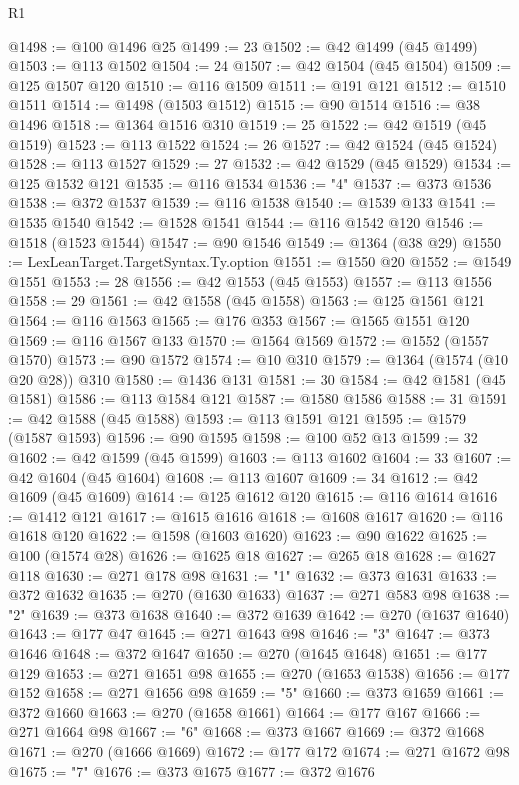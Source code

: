 \begin{lexlean}{R1}
\begin{coremodule}
@1498 := @100 @1496 @25
@1499 := 23
@1502 := @42 @1499 (@45 @1499)
@1503 := @113 @1502
@1504 := 24
@1507 := @42 @1504 (@45 @1504)
@1509 := @125 @1507 @120
@1510 := @116 @1509
@1511 := @191 @121
@1512 := @1510 @1511
@1514 := @1498 (@1503 @1512)
@1515 := @90 @1514
@1516 := @38 @1496
@1518 := @1364 @1516 @310
@1519 := 25
@1522 := @42 @1519 (@45 @1519)
@1523 := @113 @1522
@1524 := 26
@1527 := @42 @1524 (@45 @1524)
@1528 := @113 @1527
@1529 := 27
@1532 := @42 @1529 (@45 @1529)
@1534 := @125 @1532 @121
@1535 := @116 @1534
@1536 := "4"
@1537 := @373 @1536
@1538 := @372 @1537
@1539 := @116 @1538
@1540 := @1539 @133
@1541 := @1535 @1540
@1542 := @1528 @1541
@1544 := @116 @1542 @120
@1546 := @1518 (@1523 @1544)
@1547 := @90 @1546
@1549 := @1364 (@38 @29)
@1550 := LexLeanTarget.TargetSyntax.Ty.option
@1551 := @1550 @20
@1552 := @1549 @1551
@1553 := 28
@1556 := @42 @1553 (@45 @1553)
@1557 := @113 @1556
@1558 := 29
@1561 := @42 @1558 (@45 @1558)
@1563 := @125 @1561 @121
@1564 := @116 @1563
@1565 := @176 @353
@1567 := @1565 @1551 @120
@1569 := @116 @1567 @133
@1570 := @1564 @1569
@1572 := @1552 (@1557 @1570)
@1573 := @90 @1572
@1574 := @10 @310
@1579 := @1364 (@1574 (@10 @20 @28)) @310
@1580 := @1436 @131
@1581 := 30
@1584 := @42 @1581 (@45 @1581)
@1586 := @113 @1584 @121
@1587 := @1580 @1586
@1588 := 31
@1591 := @42 @1588 (@45 @1588)
@1593 := @113 @1591 @121
@1595 := @1579 (@1587 @1593)
@1596 := @90 @1595
@1598 := @100 @52 @13
@1599 := 32
@1602 := @42 @1599 (@45 @1599)
@1603 := @113 @1602
@1604 := 33
@1607 := @42 @1604 (@45 @1604)
@1608 := @113 @1607
@1609 := 34
@1612 := @42 @1609 (@45 @1609)
@1614 := @125 @1612 @120
@1615 := @116 @1614
@1616 := @1412 @121
@1617 := @1615 @1616
@1618 := @1608 @1617
@1620 := @116 @1618 @120
@1622 := @1598 (@1603 @1620)
@1623 := @90 @1622
@1625 := @100 (@1574 @28)
@1626 := @1625 @18
@1627 := @265 @18
@1628 := @1627 @118
@1630 := @271 @178 @98
@1631 := "1"
@1632 := @373 @1631
@1633 := @372 @1632
@1635 := @270 (@1630 @1633)
@1637 := @271 @583 @98
@1638 := "2"
@1639 := @373 @1638
@1640 := @372 @1639
@1642 := @270 (@1637 @1640)
@1643 := @177 @47
@1645 := @271 @1643 @98
@1646 := "3"
@1647 := @373 @1646
@1648 := @372 @1647
@1650 := @270 (@1645 @1648)
@1651 := @177 @129
@1653 := @271 @1651 @98
@1655 := @270 (@1653 @1538)
@1656 := @177 @152
@1658 := @271 @1656 @98
@1659 := "5"
@1660 := @373 @1659
@1661 := @372 @1660
@1663 := @270 (@1658 @1661)
@1664 := @177 @167
@1666 := @271 @1664 @98
@1667 := "6"
@1668 := @373 @1667
@1669 := @372 @1668
@1671 := @270 (@1666 @1669)
@1672 := @177 @172
@1674 := @271 @1672 @98
@1675 := "7"
@1676 := @373 @1675
@1677 := @372 @1676

\end{coremodule}
\end{lexlean}
